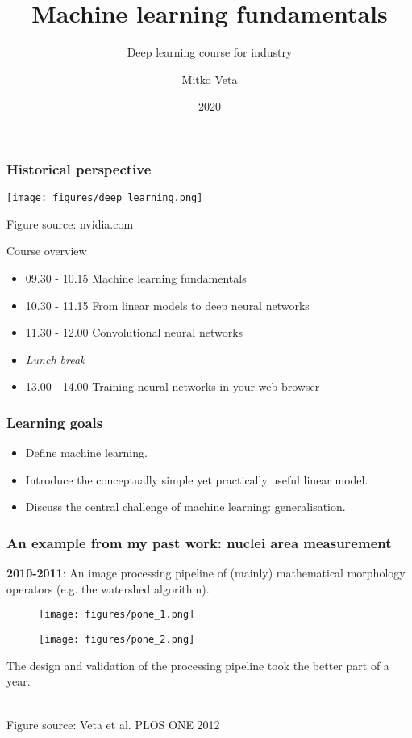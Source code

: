 \documentclass[notes]{beamer}          %
\title{Machine learning fundamentals}
\subtitle{Deep learning course for industry }
\author{Mitko Veta}
\institute{Eindhoven University of Technology


Department of Biomedical Engineering}
\date{2020}
\begin{document}
 
\frame{\titlepage}


\begin{frame}
\frametitle{Historical perspective}
\begin{center}
\texttt{[image: figures/deep\_learning.png]}
\end{center}
{\tiny Figure source: nvidia.com}
\end{frame}


\begin{frame}[allowframebreaks]{Course overview}

        \begin{itemize}
            \item 09.30 - 10.15 Machine learning fundamentals
            \item 10.30 - 11.15 From linear models to deep neural networks
            \item 11.30 - 12.00 Convolutional neural networks
            \item \textit{Lunch break}
	    \item 13.00 - 14.00 Training neural networks in your web browser
        \end{itemize}
    
\end{frame}

\begin{frame}
\frametitle{Learning goals}
\begin{itemize}
    \item Define machine learning.
    \item Introduce the conceptually simple yet practically useful linear model. 
    \item Discuss the central challenge of machine learning: generalisation.
\end{itemize}
\end{frame}


\begin{frame}
\frametitle{An example from my past work: nuclei area measurement}

\textbf{2010-2011}: An image processing pipeline of (mainly) mathematical morphology operators (e.g. the watershed algorithm).

\begin{figure}[ht]
        \begin{minipage}[b]{0.3\linewidth}
            \centering
            \texttt{[image: figures/pone\_1.png]}
        \end{minipage}
        \hspace{0.5cm}
        \begin{minipage}[b]{0.3\linewidth}
            \centering
            \texttt{[image: figures/pone\_2.png]}
        \end{minipage}
 \end{figure}

The design and validation of the processing pipeline took the better part of a year. \\~\

{\tiny Figure source: Veta et al. PLOS ONE 2012}

\end{frame}
\end{document}
